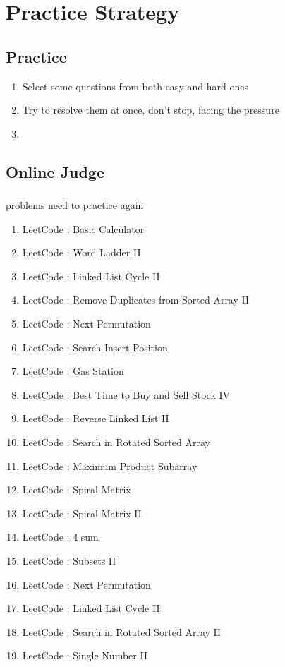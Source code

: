 \chapter{Practice Strategy}

\section{Practice }
\begin{enumerate}
    \item Select some questions from both easy and hard ones
    \item Try to resolve them at once, don't stop, facing the pressure
    \item
\end{enumerate}

\section{Online Judge }

\subsection{}

problems need to practice again

\begin{enumerate}
    \item LeetCode : Basic Calculator
    \item LeetCode : Word Ladder II
    \item LeetCode : Linked List Cycle II
    \item LeetCode : Remove Duplicates from Sorted Array II
    \item LeetCode : Next Permutation
    \item LeetCode : Search Insert Position
    \item LeetCode : Gas Station
    \item LeetCode : Best Time to Buy and Sell Stock IV
    \item LeetCode : Reverse Linked List II
    \item LeetCode : Search in Rotated Sorted Array
    \item LeetCode : Maximum Product Subarray
    \item LeetCode : Spiral Matrix
    \item LeetCode : Spiral Matrix II
    \item LeetCode : 4 sum
    \item LeetCode : Subsets II
    \item LeetCode : Next Permutation
    \item LeetCode : Linked List Cycle II
    \item LeetCode : Search in Rotated Sorted Array II    
    \item LeetCode : Single Number II
\end{enumerate}



